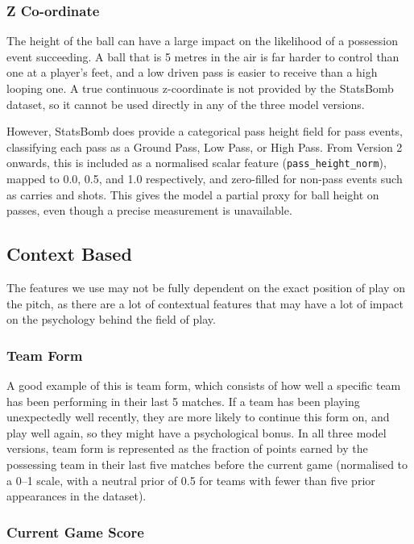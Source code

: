 \documentclass{article}
\begin{document}
\subsubsection{Z Co-ordinate}

The height of the ball can have a large impact on the likelihood of a possession event succeeding. A ball that is 5 metres in the air is far harder to control than one at a player's feet, and a low driven pass is easier to receive than a high looping one. A true continuous z-coordinate is not provided by the StatsBomb dataset, so it cannot be used directly in any of the three model versions.

However, StatsBomb does provide a categorical pass height field for pass events, classifying each pass as a Ground Pass, Low Pass, or High Pass. From Version 2 onwards, this is included as a normalised scalar feature (\texttt{pass\_height\_norm}), mapped to 0.0, 0.5, and 1.0 respectively, and zero-filled for non-pass events such as carries and shots. This gives the model a partial proxy for ball height on passes, even though a precise measurement is unavailable.

\subsection{Context Based}

The features we use may not be fully dependent on the exact position of play on the pitch, as there are a lot of contextual features that may have a lot of impact on the psychology behind the field of play.

\subsubsection{Team Form}

A good example of this is team form, which consists of how well a specific team has been performing in their last 5 matches. If a team has been playing unexpectedly well recently, they are more likely to continue this form on, and play well again, so they might have a psychological bonus. In all three model versions, team form is represented as the fraction of points earned by the possessing team in their last five matches before the current game (normalised to a 0--1 scale, with a neutral prior of 0.5 for teams with fewer than five prior appearances in the dataset).

\subsubsection{Current Game Score}
\end{document}
